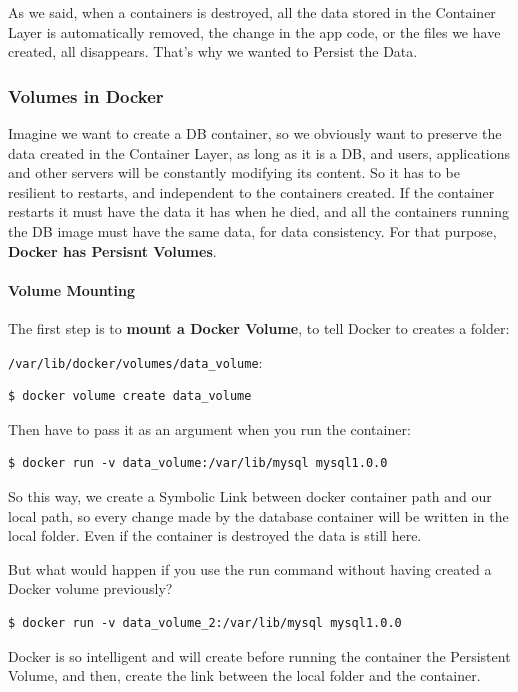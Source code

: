 \documentclass{article}
\newenvironment{blocktemplate}[1]{%
    \tcolorbox[beamer,%
    noparskip,breakable,
    colframe=Blue,%
    colbacklower=LimeGreen!75!LightGreen,%
    title=#1]}%
    {\endtcolorbox}
\newenvironment{codetemplate}[1][]{%
  \mybasecolorbox[#1]
  \itshape
}{%
  \endmybasecolorbox
}
\begin{document}
As we said, when a containers is destroyed, all the data stored in the Container Layer is automatically removed, the change in the app code, or the files we have created, all disappears. That's why we wanted to Persist the Data.

\subsubsection{Volumes in Docker}
\label{dockmount}
Imagine we want to create a DB container, so we obviously want to preserve the data created in the Container Layer, as long as it is a DB, and users, applications and other servers will be constantly modifying its content. So it has to be resilient to restarts, and independent to the containers created. If the container restarts it must have the data it has when he died, and all the containers running the DB image must have the same data, for data consistency. For that purpose, \textbf{Docker has Persisnt Volumes}.

\paragraph{Volume Mounting}

The first step is to \textbf{mount a Docker Volume}, to tell Docker to creates a folder:

\verb|/var/lib/docker/volumes/data_volume|:

\begin{codetemplate}{}
\begin{verbatim}
$ docker volume create data_volume
\end{verbatim}
\end{codetemplate}

Then have to pass it as an argument when you run the container:
\begin{codetemplate}{}
\begin{verbatim}
$ docker run -v data_volume:/var/lib/mysql mysql1.0.0
\end{verbatim}
\end{codetemplate}

So this way, we create a Symbolic Link between docker container path and our local path, so every change made by the database container will be written in the local folder. Even if the container is destroyed the data is still here.

\begin{blocktemplate}{NOTE}
But what would happen if you use the run command without having created a Docker volume previously?
\begin{codetemplate}{}
\begin{verbatim}
$ docker run -v data_volume_2:/var/lib/mysql mysql1.0.0
\end{verbatim}
\end{codetemplate}

Docker is so intelligent and will create before running the container the Persistent Volume, and then, create the link between the local folder and the container.
\end{blocktemplate}
\end{document}
